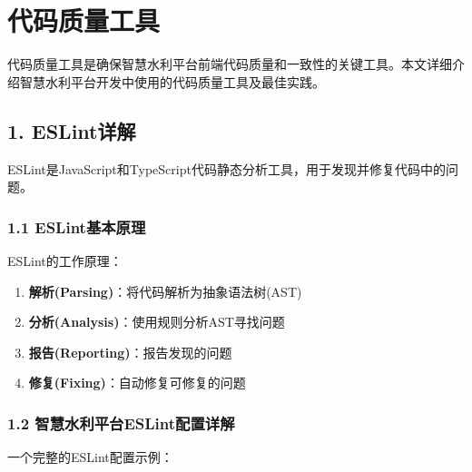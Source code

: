 \section{代码质量工具}\label{ux4ee3ux7801ux8d28ux91cfux5de5ux5177}

代码质量工具是确保智慧水利平台前端代码质量和一致性的关键工具。本文详细介绍智慧水利平台开发中使用的代码质量工具及最佳实践。

\subsection{1. ESLint详解}\label{eslintux8be6ux89e3}

ESLint是JavaScript和TypeScript代码静态分析工具，用于发现并修复代码中的问题。

\subsubsection{1.1 ESLint基本原理}\label{eslintux57faux672cux539fux7406}

ESLint的工作原理：

\begin{enumerate}
\def\labelenumi{\arabic{enumi}.}
\tightlist
\item
  \textbf{解析(Parsing)}：将代码解析为抽象语法树(AST)
\item
  \textbf{分析(Analysis)}：使用规则分析AST寻找问题
\item
  \textbf{报告(Reporting)}：报告发现的问题
\item
  \textbf{修复(Fixing)}：自动修复可修复的问题
\end{enumerate}

\subsubsection{1.2
智慧水利平台ESLint配置详解}\label{ux667aux6167ux6c34ux5229ux5e73ux53f0eslintux914dux7f6eux8be6ux89e3}

一个完整的ESLint配置示例：

